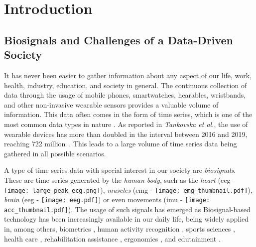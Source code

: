 
%

\chapter{Introduction}
\label{cha:introduction}



\section{Biosignals and Challenges of a Data-Driven Society} 
\label{sub:motivation1}


It has never been easier to gather information about any aspect of our life, work, health, industry, education, and society in general. The continuous collection of data through the usage of mobile phones, smartwatches, hearables, wristbands, and other non-invasive wearable sensors provides a valuable volume of information. This data often comes in the form of time series, which is one of the most common data types in nature \cite{puttinghuman}. As reported in \textit{Tankovska et al.}, the use of wearable devices has more than doubled in the interval between 2016 and 2019, reaching 722 million~\cite{tankovska_23_2020}. This leads to a large volume of time series data being gathered in all possible scenarios. 

A type of time series data with special interest in our society are \textit{biosignals}. These are time series generated by the \textit{human body}, such as the \textit{heart} (\gls{ecg} - \texttt{[image: large\_peak\_ecg.png]}), \textit{muscles} (\gls{emg} - \texttt{[image: emg\_thumbnail.pdf]}), \textit{brain} (\gls{eeg} - \texttt{[image: eeg.pdf]}) or even movements (\gls{imu} - \texttt{[image: acc\_thumbnail.pdf]}). The usage of such signals has emerged as Biosignal-based technology has been increasingly available in our daily life, being widely applied in, among others, biometrics \cite{david_thesis}, human activity recognition \cite{cpd_har_1, cpd_har_2, review_1}, sports sciences \cite{li20gait, liu22activityduration, mendes2016sensor, ji2018real, howard2016survey, mcnab2011iphone, howard2016wireless, yuji2005mems, espinosa2015inertial, ohgi2002microcomputer}, health care \cite{cpd_medical_1, cpd_medical_2, cpd_medical_3, cpd_medical_4, dataset6, dataset7}, rehabilitation assistance \cite{rehab1, rehab2}, ergonomics \cite{antonio, sara}, and edutainment \cite{edutainment}.

